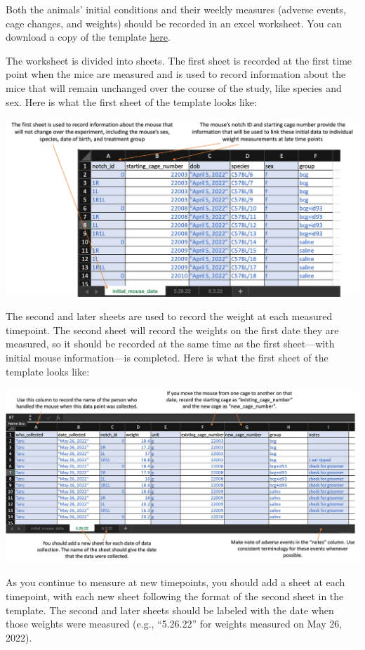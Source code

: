 \documentclass[
]{book}
\begin{document}
Both the animals' initial conditions and their weekly measures (adverse events,
cage changes, and weights) should be recorded in an excel worksheet. You can
download a copy of the template
\href{https://github.com/csu-impactb/CODING-TEAM-BOOKDOWN-/raw/main/templates/data_collection_templates/body_weights_template.xlsx}{here}.

The worksheet is divided into sheets. The first sheet is recorded at the first
time point when the mice are measured and is used to record information about
the mice that will remain unchanged over the course of the study, like species
and sex. Here is what the first sheet of the template looks like:

\includegraphics[width=1\linewidth]{figures/weight_template_initial}

The second and later sheets are used to record the weight at each measured timepoint.
The second sheet will record the weights on the first date they are measured, so
it should be recorded at the same time as the first sheet---with initial mouse
information---is completed. Here is what the first sheet of the template looks like:

\includegraphics[width=1\linewidth]{figures/weight_template_page}

As you continue to measure at new timepoints, you should add a sheet at each
timepoint, with each new sheet following the format of the second sheet in the
template. The second and later sheets should be labeled with the date when those
weights were measured (e.g., ``5.26.22'' for weights measured on May 26, 2022).
\end{document}
